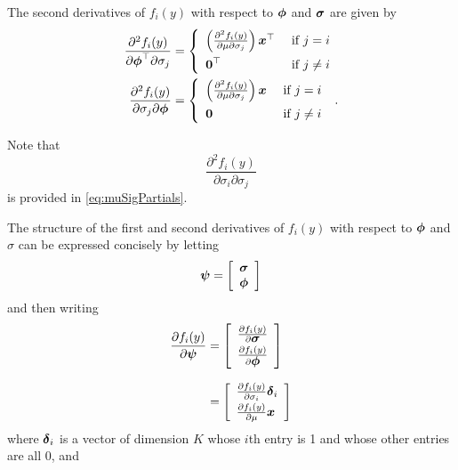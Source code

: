 The second derivatives of $f_i(y)$ with respect to $\mbox{$\boldsymbol{\phi}$}$ and $\mbox{$\boldsymbol{\sigma}$}$
are given by
\begin{align*}
\frac{\partial^2 f_i(y)}{\partial \mbox{$\boldsymbol{\phi}$}^{\top} \partial \sigma_j} &=
\left \{
\begin{array}{ll}
\left(\frac{\partial^2 f_i(y)}{\partial \mu \partial \sigma_j}
      \right) \mbox{$\boldsymbol{x}$}^{\top} & \mbox{~if~} j = i \\[0.25cm]
\mbox{$\boldsymbol{0}$}^{\top}  & \mbox{~if~} j \neq i \end{array} \right . \\
\frac{\partial^2 f_i(y)}{\partial \sigma_j \partial \mbox{$\boldsymbol{\phi}$}} &=
\left \{
\begin{array}{ll}
\left(\frac{\partial^2 f_i(y)}{\partial \mu \partial \sigma_j} \right) \mbox{$\boldsymbol{x}$}
& \mbox{~if~} j = i \\[0.25cm]
  \mbox{$\boldsymbol{0}$}  & \mbox{~if~} j \neq i \end{array} \right . \; .
\end{align*}

Note that
\[
\frac{\partial^2 f_i(y)}{\partial \sigma_i \partial \sigma_j}
\]
is provided in \eqref{eq:muSigPartials}.

The structure of the first and second derivatives of $f_i(y)$ with respect
to $\mbox{$\boldsymbol{\phi}$}$ and $\sigma$ can be expressed concisely by letting
\[
\mbox{$\boldsymbol{\psi}$} = \left [ \begin{array}{l}
            \mbox{$\boldsymbol{\sigma}$}\\
            \mbox{$\boldsymbol{\phi}$} \end{array} \right ]
\]
and then writing
\begin{align*}
\frac{\partial f_i(y)}{\partial \mbox{$\boldsymbol{\psi}$}} &= 
\left[ \begin{array}{l}
\frac{\partial f_i(y)}{\partial \mbox{$\boldsymbol{\sigma}$}} \\[0.1cm]
\frac{\partial f_i(y)}{\partial \mbox{$\boldsymbol{\phi}$}}
\end{array} \right] \\[0.25cm]
&=\left[ \begin{array}{l}
       \frac{\partial f_i(y)}{\partial \sigma_i} \mbox{$\boldsymbol{\delta}$}_i\\[0.1cm]
       \frac{\partial f_i(y)}{\partial \mu} \mbox{$\boldsymbol{x}$} 
       \end{array} \right]
\end{align*}
where $\mbox{$\boldsymbol{\delta}$}_i$ is a vector of dimension $K$ whose $i$th entry is 1 
and whose other entries are all 0, and

